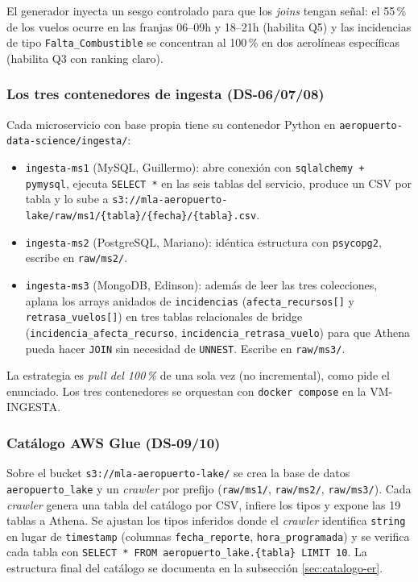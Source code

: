 El generador inyecta un sesgo controlado para que los \emph{joins}
tengan señal: el 55\,\% de los vuelos ocurre en las franjas 06--09h y
18--21h (habilita Q5) y las incidencias de tipo
\texttt{Falta\_Combustible} se concentran al 100\,\% en dos aerolíneas
específicas (habilita Q3 con ranking claro).

\subsubsection{Los tres contenedores de ingesta (DS-06/07/08)}
Cada microservicio con base propia tiene su contenedor Python en
\texttt{aeropuerto-data-science/ingesta/}:

\begin{itemize}
  \item \texttt{ingesta-ms1} (MySQL, Guillermo): abre conexión con
    \texttt{sqlalchemy + pymysql}, ejecuta \texttt{SELECT *} en las seis
    tablas del servicio, produce un CSV por tabla y lo sube a
    \texttt{s3://mla-aeropuerto-lake/raw/ms1/\{tabla\}/\{fecha\}/\{tabla\}.csv}.
  \item \texttt{ingesta-ms2} (PostgreSQL, Mariano): idéntica estructura
    con \texttt{psycopg2}, escribe en \texttt{raw/ms2/}.
  \item \texttt{ingesta-ms3} (MongoDB, Edinson): además de leer las tres
    colecciones, aplana los arrays anidados de \texttt{incidencias}
    (\texttt{afecta\_recursos[]} y \texttt{retrasa\_vuelos[]}) en tres
    tablas relacionales de bridge
    (\texttt{incidencia\_afecta\_recurso},
    \texttt{incidencia\_retrasa\_vuelo}) para que Athena pueda hacer
    \texttt{JOIN} sin necesidad de \texttt{UNNEST}. Escribe en
    \texttt{raw/ms3/}.
\end{itemize}

La estrategia es \emph{pull del 100\,\%} de una sola vez (no
incremental), como pide el enunciado. Los tres contenedores se orquestan
con \texttt{docker compose} en la VM-INGESTA.

\subsubsection{Catálogo AWS Glue (DS-09/10)}
Sobre el bucket \texttt{s3://mla-aeropuerto-lake/} se crea la base de
datos \texttt{aeropuerto\_lake} y un \emph{crawler} por prefijo
(\texttt{raw/ms1/}, \texttt{raw/ms2/}, \texttt{raw/ms3/}). Cada
\emph{crawler} genera una tabla del catálogo por CSV, infiere los tipos
y expone las 19 tablas a Athena. Se ajustan los tipos inferidos donde
el \emph{crawler} identifica \texttt{string} en lugar de
\texttt{timestamp} (columnas \texttt{fecha\_reporte},
\texttt{hora\_programada}) y se verifica cada tabla con
\texttt{SELECT * FROM aeropuerto\_lake.\{tabla\} LIMIT 10}. La estructura
final del catálogo se documenta en la subsección
\ref{sec:catalogo-er}.

